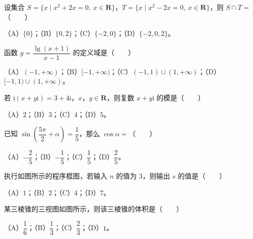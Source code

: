 

\begin{question}
设集合 $S=\{x\mid x^2+2x=0,\ x\in\mathbf R\}$，$T=\{x\mid x^2-2x=0,\ x\in\mathbf R\}$，则 $S\cap T=$\mbox{（　　）}

（A）$\{0\}$；（B）$\{0,2\}$；（C）$\{-2,0\}$；（D）$\{-2,0,2\}$。

\end{question}
\begin{question}
函数 $y=\dfrac{\lg(x+1)}{x-1}$ 的定义域是\mbox{（　　）}

（A）$(-1,+\infty)$；（B）$[-1,+\infty)$；（C）$(-1,1)\cup(1,+\infty)$；（D）$[-1,1)\cup(1,+\infty)$。

\end{question}
\begin{question}
若 $\mathrm i(x+y\mathrm i)=3+4\mathrm i$，$x$，$y\in\mathbf R$，则复数 $x+y\mathrm i$ 的模是\mbox{（　　）}

（A）$2$；（B）$3$；（C）$4$；（D）$5$。

\end{question}
\begin{question}
已知 $\sin\left(\dfrac{5\pi}2+\alpha\right)=\dfrac15$，那么 $\cos\alpha=$\mbox{（　　）}

（A）$-\dfrac25$；（B）$-\dfrac15$；（C）$\dfrac15$；（D）$\dfrac25$。

\Needspace{0.4\textheight}
\end{question}
\begin{question}
执行如图所示的程序框图，若输入 $n$ 的值为 $3$，则输出 $s$ 的值是\mbox{（　　）}
\nopagebreak[4]
\begin{center}\end{center}
\nopagebreak[4]
（A）$1$；（B）$2$；（C）$4$；（D）$7$。

\Needspace{0.4\textheight}
\end{question}
\begin{question}
某三棱锥的三视图如图所示，则该三棱锥的体积是\mbox{（　　）}
\nopagebreak[4]
\begin{center}\end{center}
\nopagebreak[4]
（A）$\dfrac16$；（B）$\dfrac13$；（C）$\dfrac23$；（D）$1$。

\end{question}
